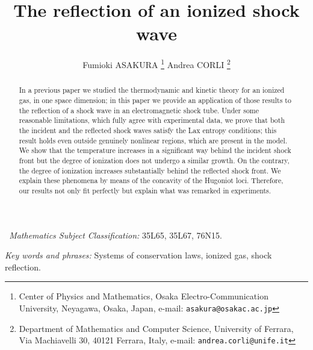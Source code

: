 \documentclass[10pt,a4paper]{article}
\numberwithin{equation}{section}
\begin{document}
\title{The reflection of an ionized shock wave}
\author{Fumioki ASAKURA
\footnote{Center of Physics and Mathematics, Osaka Electro-Communication University, Neyagawa, Osaka, Japan,
 e-mail: {\tt\small asakura@osakac.ac.jp}}
\hspace{4ex}
Andrea CORLI
\footnote{Department of Mathematics and Computer Science, University of Ferrara, Via Machiavelli 30, 40121 Ferrara, Italy,
e-mail: {\tt\small andrea.corli@unife.it}}
}
\maketitle

\begin{abstract}
In a previous paper we studied the thermodynamic and kinetic theory for an ionized gas, in one space dimension; in this paper we provide an application of those results to the reflection of a shock wave in an electromagnetic shock tube. Under some reasonable limitations, which fully agree with experimental data, we prove that both the incident and the reflected shock waves satisfy the Lax entropy conditions; this result holds even outside genuinely nonlinear regions, which are present in the model.
We show that the temperature increases in a significant way behind the incident shock front but the degree of ionization does not undergo a similar growth. On the contrary, the degree of ionization increases substantially behind the reflected shock front. We explain these phenomena by means of the concavity of the Hugoniot loci. 
Therefore, our results not only fit perfectly but explain what was remarked in experiments.
\end{abstract}

\smallskip

\textit{~Mathematics Subject Classification:} 35L65, 35L67, 76N15.

\smallskip

\textit{\quad Key words and phrases:}
Systems of conservation laws, ionized gas, shock reflection.
\end{document}
